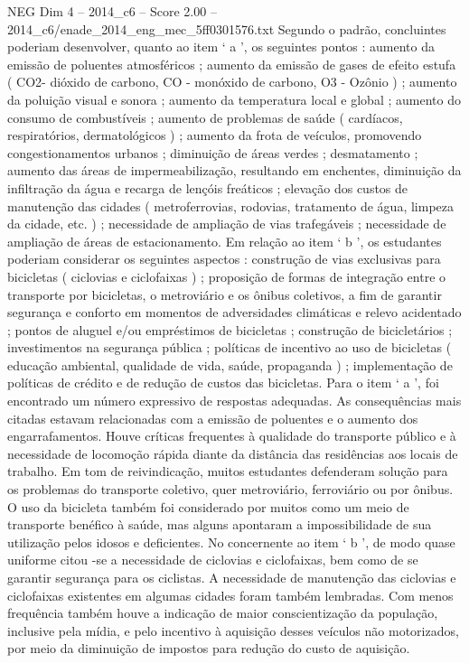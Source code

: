 \begin{textsample}{NEG Dim 4 – 2014\_c6 – Score 2.00 – 2014\_c6/enade\_2014\_eng\_mec\_5ff0301576.txt}
Segundo o padrão, concluintes poderiam desenvolver, quanto ao item ‘ a ’, os seguintes pontos : aumento da emissão de poluentes atmosféricos ; aumento da emissão de gases de efeito estufa ( CO2- dióxido de carbono, CO - monóxido de carbono, O3 - Ozônio ) ; aumento da poluição visual e sonora ; aumento da temperatura local e global ; aumento do consumo de combustíveis ; aumento de problemas de saúde ( cardíacos, respiratórios, dermatológicos ) ; aumento da frota de veículos, promovendo congestionamentos urbanos ; diminuição de áreas verdes ; desmatamento ; aumento das áreas de impermeabilização, resultando em enchentes, diminuição da infiltração da água e recarga de lençóis freáticos ; elevação dos custos de manutenção das cidades ( metroferrovias, rodovias, tratamento de água, limpeza da cidade, etc. ) ; necessidade de ampliação de vias trafegáveis ; necessidade de ampliação de áreas de estacionamento.
Em relação ao item ‘ b ’, os estudantes poderiam considerar os seguintes aspectos : construção de vias exclusivas para bicicletas ( ciclovias e ciclofaixas ) ; proposição de formas de integração entre o transporte por bicicletas, o metroviário e os ônibus coletivos, a fim de garantir segurança e conforto em momentos de adversidades climáticas e relevo acidentado ; pontos de aluguel e/ou empréstimos de bicicletas ; construção de bicicletários ; investimentos na segurança pública ; políticas de incentivo ao uso de bicicletas ( educação ambiental, qualidade de vida, saúde, propaganda ) ; implementação de políticas de crédito e de redução de custos das bicicletas.
Para o item ‘ a ’, foi encontrado um número expressivo de respostas adequadas.
As consequências mais citadas estavam relacionadas com a emissão de poluentes e o aumento dos engarrafamentos.
Houve críticas frequentes à qualidade do transporte público e à necessidade de locomoção rápida diante da distância das residências aos locais de trabalho.
Em tom de reivindicação, muitos estudantes defenderam solução para os problemas do transporte coletivo, quer metroviário, ferroviário ou por ônibus.
O uso da bicicleta também foi considerado por muitos como um meio de transporte benéfico à saúde, mas alguns apontaram a impossibilidade de sua utilização pelos idosos e deficientes.
No concernente ao item ‘ b ’, de modo quase uniforme citou -se a necessidade de ciclovias e ciclofaixas, bem como de se garantir segurança para os ciclistas.
A necessidade de manutenção das ciclovias e ciclofaixas existentes em algumas cidades foram também lembradas.
Com menos frequência também houve a indicação de maior conscientização da população, inclusive pela mídia, e pelo incentivo à aquisição desses veículos não motorizados, por meio da diminuição de impostos para redução do custo de aquisição.

\end{textsample}
